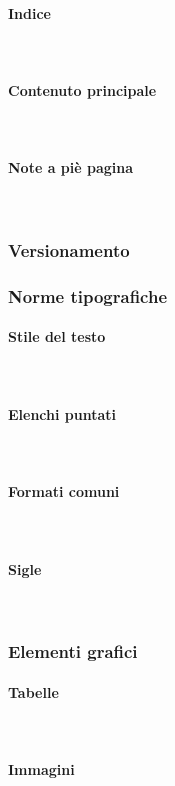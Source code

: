 		\paragraph{Indice} \mbox{}\\
		\paragraph{Contenuto principale} \mbox{}\\
		\paragraph{Note a piè pagina} \mbox{}\\
		\subsubsection{Versionamento}
		\subsubsection{Norme tipografiche}
		\paragraph{Stile del testo} \mbox{}\\
		\paragraph{Elenchi puntati} \mbox{}\\
		\paragraph{Formati comuni} \mbox{}\\
		\paragraph{Sigle} \mbox{}\\
		\subsubsection{Elementi grafici}
		\paragraph{Tabelle} \mbox{}\\
		\paragraph{Immagini} \mbox{}\\
